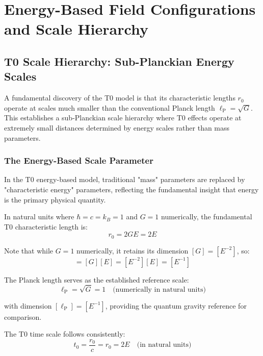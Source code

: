 \documentclass[12pt,a4paper]{report}
\newcommand{\lP}{\ell_{\text{P}}}         %
\newcommand{\rzero}{r_0}                  %
\newcommand{\tzero}{t_0}                  %
\begin{document}
\chapter{Energy-Based Field Configurations and Scale Hierarchy}
\label{chap:energy_field_configurations}

\section{T0 Scale Hierarchy: Sub-Planckian Energy Scales}
\label{sec:scale_hierarchy}

A fundamental discovery of the T0 model is that its characteristic lengths $\rzero$ operate at scales much smaller than the conventional Planck length $\lP = \sqrt{G}$. This establishes a sub-Planckian scale hierarchy where T0 effects operate at extremely small distances determined by energy scales rather than mass parameters.

\subsection{The Energy-Based Scale Parameter}
\label{subsec:energy_scale_parameter}

In the T0 energy-based model, traditional "mass" parameters are replaced by "characteristic energy" parameters, reflecting the fundamental insight that energy is the primary physical quantity.

In natural units where $\hbar = c = k_B = 1$ and $G = 1$ numerically, the fundamental T0 characteristic length is:
\begin{equation}
	\boxed{\rzero = 2GE = 2E}
	\label{eq:fundamental_r0}
\end{equation}

Note that while $G = 1$ numerically, it retains its dimension $[G] = [E^{-2}]$, so:
\begin{equation}
	[\rzero] = [G][E] = [E^{-2}][E] = [E^{-1}]
	\label{eq:dimensional_consistency}
\end{equation}

The Planck length serves as the established reference scale:
\begin{equation}
	\lP = \sqrt{G} = 1 \quad \text{(numerically in natural units)}
\end{equation}

with dimension $[\lP] = [E^{-1}]$, providing the quantum gravity reference for comparison.

The T0 time scale follows consistently:
\begin{equation}
	\tzero = \frac{\rzero}{c} = \rzero = 2E \quad \text{(in natural units)}
\end{equation}
\end{document}
